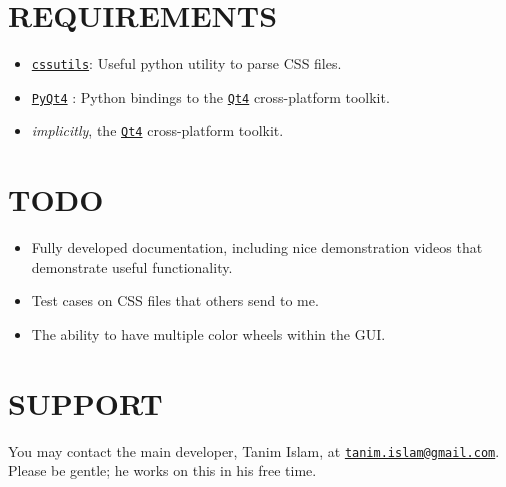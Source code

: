 \documentclass[]{article}
\begin{document}
\section{REQUIREMENTS}
\begin{itemize}
  \item \href{http://pythonhosted.org/cssutils/}{\texttt{cssutils}}:
    Useful python utility to parse CSS files.
  \item
    \href{https://www.riverbankcomputing.com/software/pyqt/intro}{\texttt{PyQt4}}
    : Python bindings to the
    \href{http://doc.qt.io/qt-4.8/index.html}{\texttt{Qt4}}
    cross-platform toolkit.
  \item\textit{implicitly}, the \href{http://doc.qt.io/qt-4.8/index.html}{\texttt{Qt4}}
    cross-platform toolkit.
\end{itemize}

\section{TODO}
\begin{itemize}
  \item Fully developed documentation, including nice demonstration
    videos that demonstrate useful functionality.
  \item Test cases on CSS files that others send to me.
  \item The ability to have multiple color wheels within the GUI.
\end{itemize}

\section{SUPPORT}
You may contact the main developer, Tanim Islam, at
\href{mailto:tanim.islam@gmail.com}{\texttt{tanim.islam@gmail.com}}. Please
be gentle; he works on this in his free time.
\end{document}
